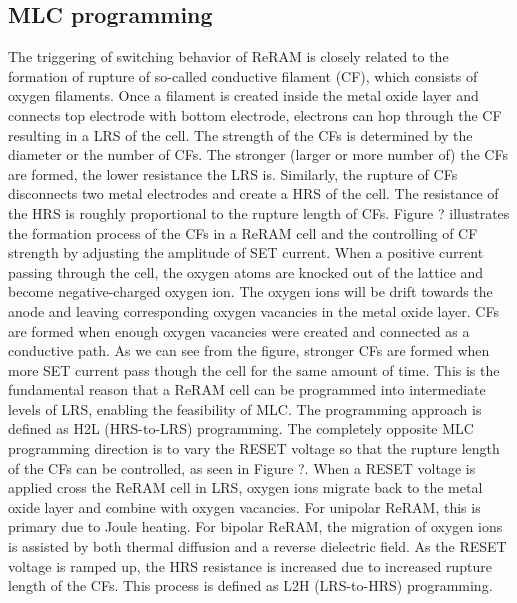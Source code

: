 \subsection{MLC programming}
The triggering of switching behavior of ReRAM is closely related to the formation of rupture of so-called conductive filament (CF), which consists of oxygen filaments. Once a filament is created inside the metal oxide layer and connects top electrode with bottom electrode, electrons can hop through the CF resulting in a LRS of the cell. The strength of the CFs is determined by the diameter or the number of CFs. The stronger (larger or more number of) the CFs are formed, the lower resistance the LRS is. Similarly, the rupture of CFs disconnects two metal electrodes and create a HRS of the cell. The resistance of the HRS is roughly proportional to the rupture length of CFs. Figure ? illustrates the formation process of the CFs in a ReRAM cell and the controlling of CF strength by adjusting the amplitude of SET current. When a positive current passing through the cell, the oxygen atoms are knocked out of the lattice and become negative-charged oxygen ion. The oxygen ions will be drift towards the anode and leaving corresponding oxygen vacancies in the metal oxide layer. CFs are formed when enough oxygen vacancies were created and connected as a conductive path. As we can see from the figure, stronger CFs are formed when more SET current pass though the cell for the same amount of time. This is the fundamental reason that a ReRAM cell can be programmed into intermediate levels of LRS, enabling the feasibility of MLC. The programming approach is defined as H2L (HRS-to-LRS) programming. The completely opposite MLC programming direction is to vary the RESET voltage so that the rupture length of the CFs can be controlled, as seen in Figure ?. When a RESET voltage is applied cross the ReRAM cell in LRS, oxygen ions migrate back to the metal oxide layer and combine with oxygen vacancies. For unipolar ReRAM, this is primary due to Joule heating. For bipolar ReRAM, the migration of oxygen ions is assisted by both thermal diffusion and a reverse dielectric field. As the RESET voltage is ramped up, the HRS resistance is increased due to increased rupture length of the CFs. This process is defined as L2H (LRS-to-HRS) programming. 

